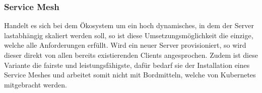 \subsubsection{Service Mesh}
Handelt es sich bei dem Ökosystem um ein hoch dynamisches, in dem der Server lastabhängig skaliert werden soll, so ist diese Umsetzungsmöglichkeit die einzige, welche alle Anforderungen erfüllt.
Wird ein neuer Server provisioniert, so wird dieser direkt von allen bereits existierenden Clients angesprochen.
Zudem ist diese Variante die fairste und leistungsfähigste, dafür bedarf sie der Installation eines Service Meshes und arbeitet somit nicht mit Bordmitteln, welche von Kubernetes mitgebracht werden.
